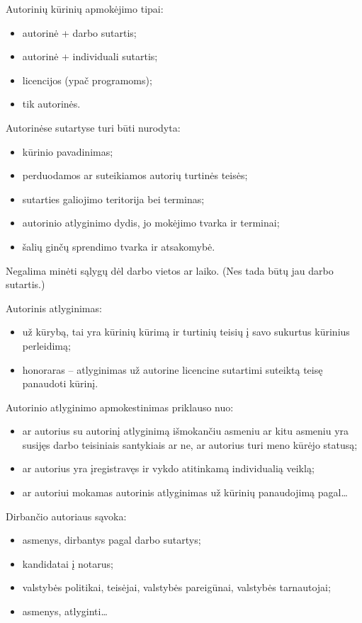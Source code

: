 Autorinių kūrinių apmokėjimo tipai:
\begin{itemize}
  \item autorinė + darbo sutartis;
  \item autorinė + individuali sutartis;
  \item licencijos (ypač programoms);
  \item tik autorinės.
\end{itemize}

Autorinėse sutartyse turi būti nurodyta:
\begin{itemize}
  \item kūrinio pavadinimas;
  \item perduodamos ar suteikiamos autorių turtinės teisės;
  \item sutarties galiojimo teritorija bei terminas;
  \item autorinio atlyginimo dydis, jo mokėjimo tvarka ir terminai;
  \item šalių ginčų sprendimo tvarka ir atsakomybė.
\end{itemize}
Negalima minėti sąlygų dėl darbo vietos ar laiko. (Nes tada būtų jau
darbo sutartis.)

Autorinis atlyginimas:
\begin{itemize}
  \item už kūrybą, tai yra kūrinių kūrimą ir turtinių teisių į savo
    sukurtus kūrinius perleidimą;
  \item honoraras – atlyginimas už autorine licencine sutartimi
    suteiktą teisę panaudoti kūrinį.
\end{itemize}

Autorinio atlyginimo apmokestinimas priklauso nuo:
\begin{itemize}
  \item ar autorius su autorinį atlyginimą išmokančiu asmeniu ar kitu
    asmeniu yra susijęs darbo teisiniais santykiais ar ne, ar 
    autorius turi meno kūrėjo statusą;
  \item ar autorius yra įregistravęs ir vykdo atitinkamą individualią
    veiklą;
  \item ar autoriui mokamas autorinis atlyginimas už kūrinių panaudojimą
    pagal…
\end{itemize}

Dirbančio autoriaus sąvoka:
\begin{itemize}
  \item asmenys, dirbantys pagal darbo sutartys;
  \item kandidatai į notarus;
  \item valstybės politikai, teisėjai, valstybės pareigūnai, valstybės
    tarnautojai;
  \item asmenys, atlyginti…
\end{itemize}

